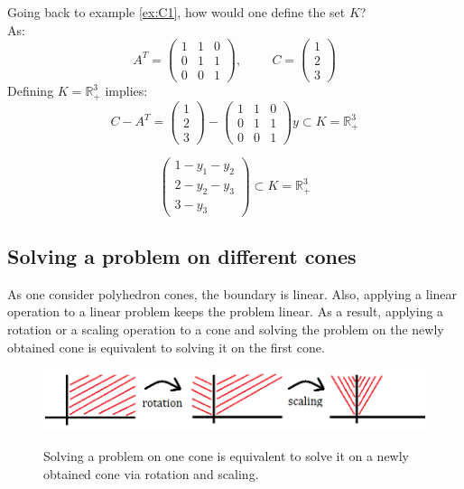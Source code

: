 \begin{example}
\begin{leftbar}
Going back to example \ref{ex:C1}, how would one define the set $K$?\\
As: 
\[A^T = \left( \begin{array}{ccc}
1 & 1 & 0 \\
0 & 1 & 1 \\
0 & 0 & 1 \end{array} \right), \hspace{1cm}
C = \left( \begin{array}{c}
1 \\
2 \\
3 \end{array} \right) \]
Defining $K = \mathbb{R}^3_+$ implies: 
\[C-A^T = 
\left( \begin{array}{c}
1 \\
2 \\
3 \end{array} \right)-
\left( \begin{array}{ccc}
1 & 1 & 0 \\
0 & 1 & 1 \\
0 & 0 & 1 
\end{array} \right) y
\subset K = \mathbb{R}^3_+ 
\]

\[\left( \begin{array}{c}
1 - y_1 - y_2 \\
2 - y_2 - y_3\\
3 - y_3 \end{array} \right) 
\subset K = \mathbb{R}^3_+ 
\]
\end{leftbar}
\end{example}

\subsection{Solving a problem on different cones}
As one consider polyhedron cones, the boundary is linear. Also, applying a linear operation to a linear problem keeps the problem linear. 
As a result, applying a rotation or a scaling operation to a cone and solving the problem on the newly obtained cone is equivalent to solving it on the first cone. \label{solving_diff_cones}
\begin{center}
\begin{figure}[h]
\centering
  \includegraphics[scale=0.6]{images/Course7_equivalenceCones.png}\\
   \label{bruno}
  \caption{Solving a problem on one cone is equivalent to solve it on a newly obtained cone via rotation and scaling.}
\end{figure}
\end{center}


